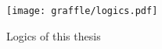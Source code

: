 
\begin{figure}
  \begin{center}
    \texttt{[image: graffle/logics.pdf]}
  \end{center}
  \caption{Logics of this thesis}
  \label{graffle.logics}
\end{figure}
